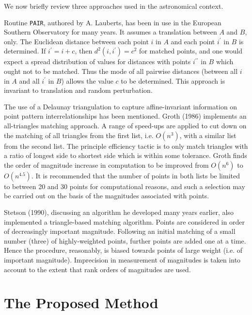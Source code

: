 We now briefly review three approaches used in the astronomical context.

Routine {\tt PAIR}, authored by A. Lauberts, has been in use in the European
Southern Observatory for many years.  It assumes a translation between
$A$ and $B$, only.  
The Euclidean distance between each point $i$ in $A$ and each
point $i^{\prime}$ in $B$ is determined.  If $i^{\prime} = i + c$, then
$d^2(i,i^{\prime}) = c^2$ for matched points, and one would expect a 
spread distribution of values for distances with points $i^{\prime\prime}$ 
in $B$ which ought
not to be matched.  Thus the mode of all pairwise distances (between all $i$ in
$A$ and all $i^{\prime}$ in $B$) allows the value $c$ to be determined.  This
approach is invariant to translation and random perturbation.  

The use of a Delaunay triangulation to capture affine-invariant information
on point pattern interrelationships has been mentioned.  
Groth (1986) implements an all-triangles matching approach.  A range of
speed-ups are applied to cut down on the matching of all triangles from
the first list, i.e. $O(n^3)$, with a similar list from the second list.
The principle efficiency tactic is to only match triangles with a 
ratio of longest side to shortest side which is within some tolerance.  
Groth finds the order of magnitude increase in computation to be improved
from $O(n^6)$ to $O(n^{4.5})$.  It is recommended that the number of points
in both lists be limited to between 20 and 30 points for computational reasons,
and such a selection may be
carried out on the basis of the magnitudes associated with points.

Stetson (1990), discussing an algorithm he developed many years earlier,
also implemented a triangle-based matching algorithm.  Points
are considered in order of decreasingly important magnitude.  Following an initial 
matching of a small number (three) of highly-weighted points, further points are
added one at a time.  Hence the procedure, reasonably, is biased towards  
points of large weight (i.e. of important magnitude).  
Imprecision in measurement of magnitudes is taken into account to the extent
that rank orders of magnitudes are used.

\section{The Proposed Method}


